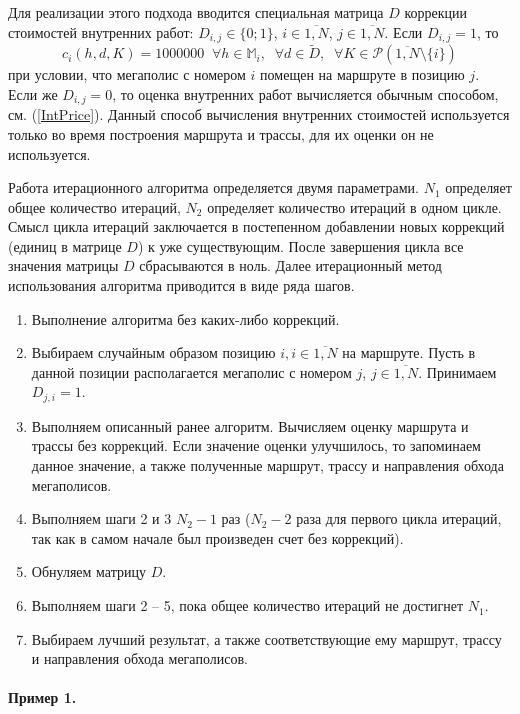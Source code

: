 Для реализации этого подхода вводится специальная матрица
$D$ коррекции стоимостей внутренних работ:
$D_{i,j}\in \{0;1\}$, $i\in \overline{1,N}$, $j\in \overline{1,N}$.
Если $D_{i,j}=1$, то
$$
  c_i(h,d,K)=1000000\;\; \forall h\in \mathbb{M}_i,\;\;
  \forall d\in \tilde{D},\;\;\forall K\in \mathcal{P}(\overline{1,N}\setminus \{i\})
$$
при условии, что мегаполис с номером $i$ помещен на маршруте в позицию $j$.
Если же $D_{i,j}=0$,
то оценка внутренних работ вычисляется обычным способом,
см. (\ref{IntPrice}).
Данный способ вычисления внутренних стоимостей используется
только во время построения маршрута и трассы,
для их оценки он не используется.

Работа итерационного алгоритма определяется двумя параметрами.
$N_1$ определяет общее количество итераций,
$N_2$ определяет количество итераций в одном цикле.
Смысл цикла итераций заключается в постепенном добавлении новых коррекций
(единиц в матрице $D$)
к уже существующим.
После завершения цикла все значения матрицы $D$ сбрасываются в ноль.
Далее итерационный метод использования алгоритма приводится в виде ряда шагов.

\begin{enumerate}
  \item
  Выполнение алгоритма без каких-либо коррекций.
  \item
  Выбираем случайным образом позицию
  $i,i\in \overline{1,N}$ на маршруте.
  Пусть в данной позиции располагается мегаполис с номером
  $j$, $j\in \overline{1,N}$.
  Принимаем $D_{j,i}=1$.
  \item
  Выполняем описанный ранее алгоритм.
  Вычисляем оценку маршрута и трассы без коррекций.
  Если значение оценки улучшилось, то запоминаем данное значение,
  а также полученные маршрут, трассу и направления обхода мегаполисов.
  \item
  Выполняем шаги 2 и 3 $N_2-1$ раз
  ($N_2-2$ раза для первого цикла итераций,
  так как в самом начале был произведен счет без коррекций).
  \item
  Обнуляем матрицу $D$.
  \item
  Выполняем шаги 2 -- 5,
  пока общее количество итераций не достигнет $N_1$.
  \item
  Выбираем лучший результат,
  а также соответствующие ему маршрут, трассу
  и направления обхода мегаполисов.
\end{enumerate}

\paragraph*{Пример 1.}

